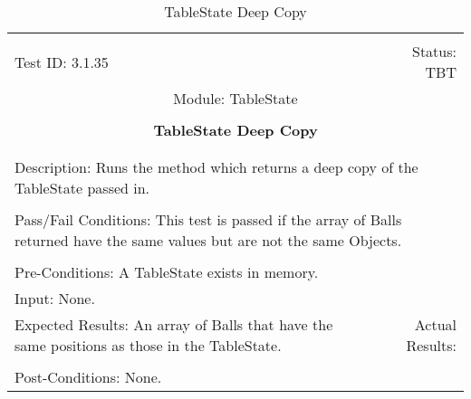 \documentclass[titlepage]{article}
\begin{document}
\begin{center}%
\begin{table}
\begin{tabular}{|l r|}\hline&\\[-2mm]
	Test ID: 3.1.35	&Status: TBT\\[-3mm]
	\multicolumn{2}{|c|}{Module: TableState}\\&\\
	\multicolumn{2}{|c|}{\textbf{\large{TableState Deep Copy}}}\\&\\\hline&\\[-3mm]
	\multicolumn{2}{|p{\textwidth}|}{Description: Runs the method which returns a deep copy of the TableState passed in.}\\[1mm]\hline&\\[-3mm]
	\multicolumn{2}{|p{\textwidth}|}{Pass/Fail Conditions: This test is passed if the array of Balls returned have the same values but are not the same Objects.}\\[1mm]\hline&\\[-3mm]
	\multicolumn{2}{|p{\textwidth}|}{Pre-Conditions: A TableState exists in memory.}\\[4mm]
	\multicolumn{2}{|p{\textwidth}|}{Input: None.}\\[2mm]\hline
	\multicolumn{1}{|p{0.49\textwidth}}{Expected Results: An array of Balls that have the same positions as those in the TableState.}	&\multicolumn{1}{|p{0.45\textwidth}|}{Actual Results: }\\\hline&\\[-3mm]
	\multicolumn{2}{|p{\textwidth}|}{Post-Conditions: None.}\\\hline
\end{tabular}
\caption{TableState Deep Copy}
\end{table}
\end{center}
\end{document}
